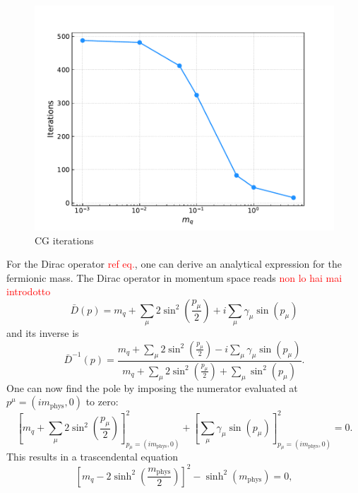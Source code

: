 \begin{figure}[h]
    \centering 
    \includegraphics[scale=0.6]{figures/correlator/CGiter.pdf}
    \caption{CG iterations}
    \label{fig:correlator_CGiter}
\end{figure} 
\newpage
For the Dirac operator \textcolor{red}{ref eq.}, one can derive an analytical expression for the fermionic mass. The Dirac operator in momentum space reads \textcolor{red}{non lo hai mai introdotto}
\begin{equation*}
\bar{D}(p)= m_q + \sum_\mu 2 \sin ^2\left(\frac{p_\mu}{2}\right)+i \sum_\mu \gamma_\mu \sin \left(p_\mu\right)
\end{equation*}
and its inverse is
\begin{equation*}
    \bar{D}^{-1}(p) = \frac{m_q + \sum_\mu 2 \sin ^2\left(\frac{p_\mu}{2}\right) - i \sum_\mu \gamma_\mu \sin \left(p_\mu\right)}{m_q + \sum_\mu 2 \sin^2\left(\frac{p_\mu}{2}\right) + \sum_\mu \sin^2 \left(p_\mu\right)}.
\end{equation*}
One can now find the pole by imposing the numerator evaluated at $p^\mu =(im_\text{phys}, 0)$ to zero:
\begin{equation*}
    \left[m_q + \sum_\mu 2 \sin ^2\left(\frac{p_\mu}{2}\right)\right]^2_{p_\mu = (im_\text{phys}, 0)} + \left[\sum_\mu \gamma_\mu \sin \left(p_\mu\right)\right]^2_{p_\mu = (im_\text{phys}, 0)} = 0.
\end{equation*}
This results in a trascendental equation 
\begin{equation*}
    \left[m_q - 2 \sinh^2\left(\frac{m_\text{phys}}{2}\right)\right]^2 - \sinh^2\left(m_\text{phys}\right) = 0,
\end{equation*}
